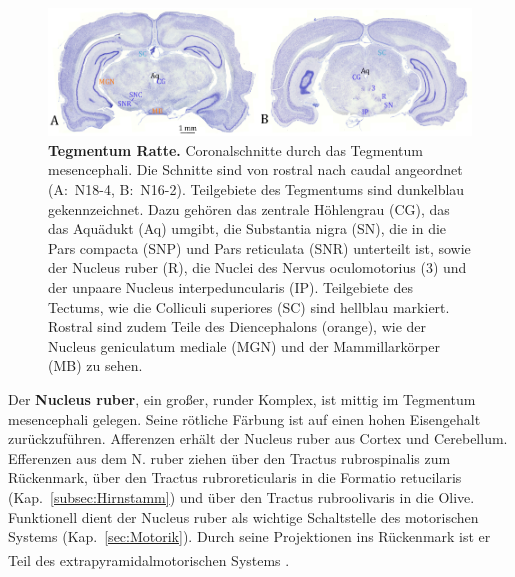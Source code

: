 \documentclass[12pt,a4paper,pdftex]{article}
\begin{document}
\begin{figure}[H]
    \centering
    \includegraphics[width=\textwidth]{pictures/Bilder_Jule/Ratte/tegmentum_mesenc.png}
    \caption[Tegmentum Ratte]{\textbf{Tegmentum Ratte.} Coronalschnitte durch das Tegmentum mesencephali. Die Schnitte sind von rostral nach caudal angeordnet (A:~N18-4, B:~N16-2). Teilgebiete des Tegmentums sind dunkelblau gekennzeichnet. Dazu gehören das zentrale Höhlengrau (CG), das das Aquädukt (Aq) umgibt, die Substantia nigra (SN), die in die Pars compacta (SNP) und Pars reticulata (SNR) unterteilt ist, sowie der Nucleus ruber (R), die Nuclei des Nervus oculomotorius (3) und der unpaare Nucleus interpeduncularis (IP). Teilgebiete des Tectums, wie die Colliculi superiores (SC) sind hellblau markiert. Rostral sind zudem Teile des Diencephalons (orange), wie der Nucleus geniculatum mediale (MGN) und der Mammillarkörper (MB) zu sehen.}
    \label{fig:tegmentum_mesenc}
\end{figure}{}

\noindent Der \textbf{Nucleus ruber}, ein großer, runder Komplex, ist mittig im Tegmentum mesencephali gelegen. Seine rötliche Färbung ist auf einen hohen Eisengehalt zurückzuführen. Afferenzen erhält der Nucleus ruber aus Cortex und Cerebellum. Efferenzen aus dem N. ruber ziehen über den Tractus rubrospinalis zum Rückenmark, über den Tractus rubroreticularis in die Formatio retucilaris (Kap.~\ref{subsec:Hirnstamm}) und über den Tractus rubroolivaris in die Olive. Funktionell dient der Nucleus ruber als wichtige Schaltstelle des motorischen Systems (Kap.~\ref{sec:Motorik}). Durch seine Projektionen ins Rückenmark ist er Teil des extrapyramidalmotorischen Systems \textsuperscript{\cite[6]{trepel2011neuroanatomie}}.\\
\end{document}
